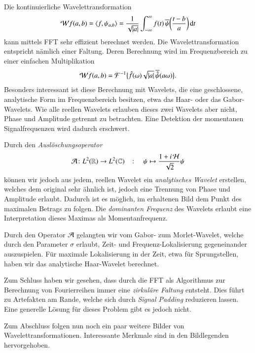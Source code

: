 Die kontinuierliche Wavelettransformation 
\begin{equation}
\Wave f (a,b)
=
\langle f,\psi_{a,b}\rangle
=
\frac{1}{\sqrt{|a|}}\int_{-\infty}^\infty f(t)\,
\overline{\psi}\biggl(\frac{t-b}{a}\biggr)\,\mathrm{d}t
\end{equation}
kann mittels FFT sehr effizient berechnet werden.
Die Wavelettransformation entspricht nämlich einer Faltung.
Deren Berechnung wird im Frequenzbereich zu einer einfachen Multiplikation
\begin{equation}
\Wave f(a,b)
= \mathcal{F}^{-1}\bigl\lbrace\hat{f}(\omega) \sqrt{|a|}\, \overline{\hat{\psi}}(a\omega)\bigr\rbrace.
\end{equation}
Besonders interessant ist diese Berechnung mit Wavelets, die eine geschlossene, analytische Form im Frequenzbereich besitzen, etwa das Haar- oder das Gabor-Wavelets.
Wie alle reellen Wavelets erlauben dieses zwei Wavelets aber nicht, Phase und Amplitude getrennt zu betrachten.
Eine Detektion der momentanen Signalfrequenzen wird dadurch erschwert.

Durch den \emph{Auslöschungsoperator}
\[
	\Ana\, \colon L^2(\mathbb R) \to L^2(\mathbb C)
	\quad\colon\quad
	\psi \mapsto \frac{1 + i\Hilb\,}{\sqrt 2}\psi
\]
können wir jedoch aus jedem, reellen Wavelet ein \emph{analytisches Wavelet} erstellen, welches dem original sehr ähnlich ist, jedoch eine Trennung von Phase und Amplitude erlaubt.
Dadurch ist es möglich, im erhaltenen Bild dem Punkt des maximalen Betrags zu folgen.
Die \emph{dominanten Frequenz} des Wavelets erlaubt eine Interpretation dieses Maximas als Momentanfrequenz.

Durch den Operator $\Ana\,$ gelangten wir vom Gabor- zum Morlet-Wavelet, welche durch den Parameter $\sigma$ erlaubt, Zeit- und Frequenz-Lokalisierung gegeneinander auszuspielen.
Für maximale Lokalisierung in der Zeit, etwa für Sprungstellen, haben wir das analytische Haar-Wavelet berechnet.

Zum Schluss haben wir gesehen, dass durch die FFT als Algorithmus zur Berechnung von Fourierreihen immer eine \emph{zirkuläre Faltung} entsteht.
Dies führt zu Artefakten am Rande, welche sich durch \emph{Signal Padding} reduzieren lassen.
Eine generelle Lösung für dieses Problem gibt es jedoch nicht.

Zum Abschluss folgen nun noch ein paar weitere Bilder von Wavelettransformationen.
Interessante Merkmale sind in den Bildlegenden hervorgehoben.


